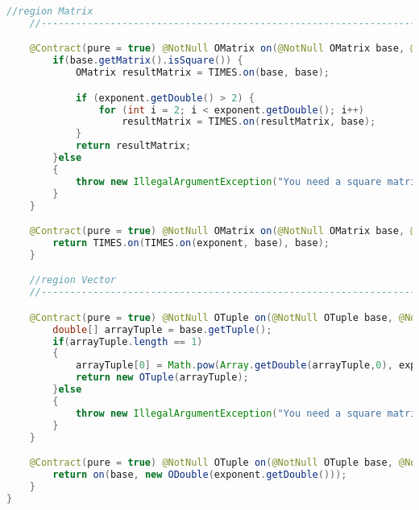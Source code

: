 \begin{lstlisting}[caption=Power (Falk),label=list:Power,language=Java]
    //region Matrix
    //------------------------------------------------------------------------------------

    @Contract(pure = true) @NotNull OMatrix on(@NotNull OMatrix base, @NotNull ODouble exponent) {
        if(base.getMatrix().isSquare()) {
            OMatrix resultMatrix = TIMES.on(base, base);

            if (exponent.getDouble() > 2) {
                for (int i = 2; i < exponent.getDouble(); i++)
                    resultMatrix = TIMES.on(resultMatrix, base);
            }
            return resultMatrix;
        }else
        {
            throw new IllegalArgumentException("You need a square matrix for power operation.");
        }
    }

    @Contract(pure = true) @NotNull OMatrix on(@NotNull OMatrix base, @NotNull OFraction exponent){
        return TIMES.on(TIMES.on(exponent, base), base);
    }

    //region Vector
    //------------------------------------------------------------------------------------

    @Contract(pure = true) @NotNull OTuple on(@NotNull OTuple base, @NotNull ODouble exponent) {
        double[] arrayTuple = base.getTuple();
        if(arrayTuple.length == 1)
        {
            arrayTuple[0] = Math.pow(Array.getDouble(arrayTuple,0), exponent.getDouble());
            return new OTuple(arrayTuple);
        }else
        {
            throw new IllegalArgumentException("You need a square matrix for power operation.");
        }
    }

    @Contract(pure = true) @NotNull OTuple on(@NotNull OTuple base, @NotNull OFraction exponent) {
        return on(base, new ODouble(exponent.getDouble()));
    }
}
\end{lstlisting}    

